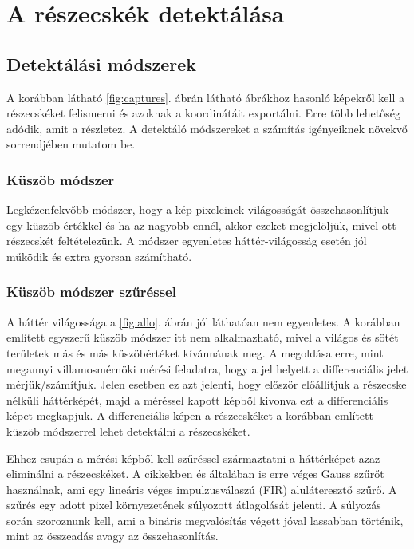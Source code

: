\chapter{A részecskék detektálása}

\section{Detektálási módszerek}
	A korábban látható \ref{fig:captures}. ábrán látható ábrákhoz hasonló képekről kell a részecskéket felismerni és
	azoknak a koordinátáit exportálni.
	Erre több lehetőség adódik, amit a \cite{Feng2007} részletez.
	A detektáló módszereket a számítás igényeiknek növekvő sorrendjében mutatom be.
\subsection{Küszöb módszer}
	Legkézenfekvőbb módszer, hogy a kép pixeleinek világosságát összehasonlítjuk egy küszöb értékkel
	és ha az nagyobb ennél, akkor ezeket megjelöljük, mivel ott részecskét feltételezünk. 
	A módszer egyenletes háttér-világosság esetén jól működik és extra gyorsan számítható.
\subsection{Küszöb módszer szűréssel}
	A háttér világossága a \ref{fig:allo}. ábrán jól láthatóan nem egyenletes.
	A korábban említett egyszerű küszöb módszer itt nem alkalmazható, mivel a világos és sötét
	területek más és más küszöbértéket kívánnának meg.
	A megoldása erre, mint megannyi villamosmérnöki mérési feladatra, hogy a jel helyett a
	differenciális jelet mérjük/számítjuk. Jelen esetben ez azt jelenti, hogy először előállítjuk a
	részecske nélküli háttérképét, majd a méréssel kapott képből kivonva ezt a differenciális képet megkapjuk.
	A differenciális képen a részecskéket a korábban említett küszöb módszerrel lehet detektálni a
	részecskéket.
	
	Ehhez csupán a mérési képből kell szűréssel származtatni a háttérképet azaz eliminálni a részecskéket.
	A \cite{Feng2007,Oxtoby2010} cikkekben és általában is erre véges Gauss szűrőt használnak, ami egy
	lineáris véges impulzusválaszú (FIR) aluláteresztő szűrő.
	A szűrés egy adott pixel környezetének súlyozott átlagolását jelenti.
	A súlyozás során szoroznunk kell, ami a bináris megvalósítás végett jóval lassabban történik, mint az
	összeadás avagy az összehasonlítás.
	
